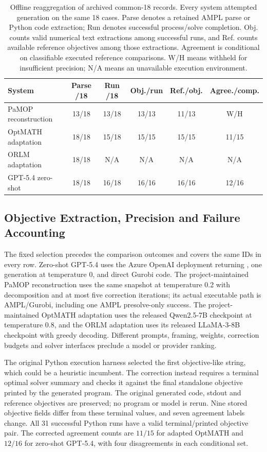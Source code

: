 \documentclass[pdflatex,sn-basic,Numbered]{sn-jnl}
\begin{document}
\begin{table}[t]
\centering\small
\caption{Offline reaggregation of archived common-18 records. Every system attempted generation on the same 18 cases. Parse denotes a retained AMPL parse or Python code extraction; Run denotes successful process/solve completion. Obj. counts valid numerical text extractions among successful runs, and Ref. counts available reference objectives among those extractions. Agreement is conditional on classifiable executed reference comparisons. W/H means withheld for insufficient precision; N/A means an unavailable execution environment.}
\label{tab:ext-outcomes}
\setlength{\tabcolsep}{2.5pt}
\begin{tabular}{@{}lccccc@{}}
\toprule
System & Parse /18 & Run /18 & Obj./run & Ref./obj. & Agree./comp.\\
\midrule
PaMOP reconstruction & 13/18 & 13/18 & 13/13 & 11/13 & W/H\\
OptMATH adaptation & 18/18 & 15/18 & 15/15 & 15/15 & 11/15\\
ORLM adaptation & 18/18 & N/A & N/A & N/A & N/A\\
GPT-5.4 zero-shot & 18/18 & 16/18 & 16/16 & 16/16 & 12/16\\
\bottomrule
\end{tabular}
\end{table}

\subsection{Objective Extraction, Precision and Failure Accounting}
The fixed selection precedes the comparison outcomes and covers the same IDs in every row. Zero-shot GPT-5.4 uses the Azure OpenAI deployment returning , one generation at temperature 0, and direct Gurobi code. The project-maintained PaMOP reconstruction uses the same snapshot at temperature 0.2 with decomposition and at most five correction iterations; its actual executable path is AMPL/Gurobi, including one AMPL presolve-only success. The project-maintained OptMATH adaptation uses the released Qwen2.5-7B checkpoint at temperature 0.8, and the ORLM adaptation uses its released LLaMA-3-8B checkpoint with greedy decoding. Different prompts, framing, weights, correction budgets and solver interfaces preclude a model or provider ranking.

The original Python execution harness selected the first objective-like string, which could be a heuristic incumbent. The correction instead requires a terminal optimal solver summary and checks it against the final standalone objective printed by the generated program. The original generated code, stdout and reference objectives are preserved; no program or model is rerun. Nine stored objective fields differ from these terminal values, and seven agreement labels change. All 31 successful Python runs have a valid terminal/printed objective pair. The corrected agreement counts are $11/15$ for adapted OptMATH and $12/16$ for zero-shot GPT-5.4, with four disagreements in each conditional set.
\end{document}
